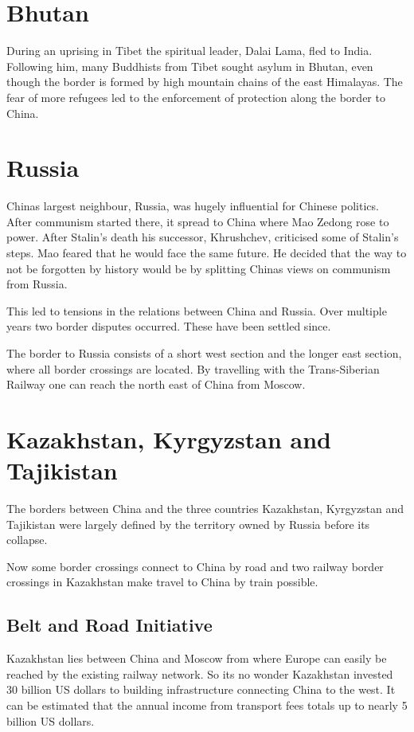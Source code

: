 \documentclass[conference]{IEEEtran}
\begin{document}
	\section{Bhutan}
	During an uprising in Tibet the spiritual leader, Dalai Lama, fled to India\cite{time_howAndWhyTheDalaiLamaLeftTibet}. Following him, many Buddhists from Tibet sought asylum in Bhutan, even though the border is formed by high mountain chains of the east Himalayas. The fear of more refugees led to the enforcement of protection along the border to China.
	
	\section{Russia}
	Chinas largest neighbour, Russia, was hugely influential for Chinese politics. After communism started there, it spread to China where Mao Zedong rose to power. After Stalin's death his successor, Khrushchev, criticised some of Stalin's steps. Mao feared that he would face the same future. He decided that the way to not be forgotten by history would be by splitting Chinas views on communism from Russia.
	
	This led to tensions in the relations between China and Russia. Over multiple years two border disputes occurred. These have been settled since.
	
	The border to Russia consists of a short west section and the longer east section, where all border crossings are located. By travelling with the Trans-Siberian Railway one can reach the north east of China from Moscow.
	
	\section{Kazakhstan, Kyrgyzstan and Tajikistan}
	The borders between China and the three countries Kazakhstan, Kyrgyzstan and Tajikistan were largely defined by the territory owned by Russia before its collapse.
	
	Now some border crossings connect to China by road and two railway border crossings in Kazakhstan make travel to China by train possible.
	
	\subsection{Belt and Road Initiative}
	Kazakhstan lies between China and Moscow from where Europe can easily be reached by the existing railway network. So its no wonder Kazakhstan invested 30 billion US dollars to building infrastructure connecting China to the west. It can be estimated that the annual income from transport fees totals up to nearly 5 billion US dollars.
	
\end{document}
